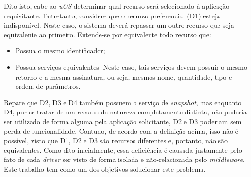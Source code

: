 Dito isto, cabe ao \emph{uOS} determinar qual recurso será selecionado à aplicação requisitante. Entretanto, considere que o recurso preferencial (D1) esteja indisponível. Neste caso, o sistema deverá repassar um outro recurso que seja equivalente ao primeiro. Entende-se por equivalente todo recurso que:

\begin{itemize}
	\item Possua o mesmo identificador;
	\item Possua serviços equivalentes. Neste caso, tais serviços devem possuir o mesmo retorno e a mesma assinatura, ou seja, mesmos nome, quantidade, tipo e ordem de parâmetros.
\end{itemize}

Repare que D2, D3 e D4 também possuem o serviço de \emph{snapshot}, mas enquanto D4, por se tratar de um recurso de natureza completamente distinta, não poderia ser utilizado de forma alguma pela aplicação solicitante, D2 e D3 poderiam sem perda de funcionalidade. Contudo, de acordo com a definição acima, isso não é possível, visto que D1, D2 e D3 são recursos diferentes e, portanto, não são equivalentes. Como dito inicialmente, essa deficiência é causada justamente pelo fato de cada \emph{driver} ser visto de forma isolada e não-relacionada pelo \emph{middleware}. Este trabalho tem como um dos objetivos solucionar este problema.

